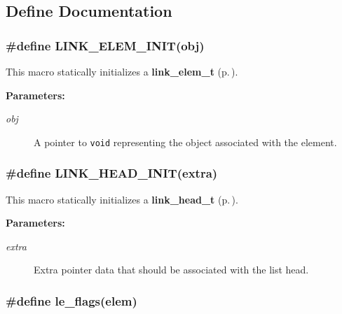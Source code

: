 \subsection{Define Documentation}
\subsubsection{\setlength{\rightskip}{0pt plus 5cm}\#define LINK\_\-ELEM\_\-INIT(obj)}\label{group__dbprim__link_a19}




 This macro statically initializes a {\bf link\_\-elem\_\-t} {\rm (p.\,\pageref{group__dbprim__link_a1})}.\begin{Desc}
\item[{\bf Parameters: }]\par
\begin{description}
\item[
{\em obj}]A pointer to {\tt void} representing the object associated with the element. \end{description}
\end{Desc}
\subsubsection{\setlength{\rightskip}{0pt plus 5cm}\#define LINK\_\-HEAD\_\-INIT(extra)}\label{group__dbprim__link_a13}




 This macro statically initializes a {\bf link\_\-head\_\-t} {\rm (p.\,\pageref{group__dbprim__link_a0})}.\begin{Desc}
\item[{\bf Parameters: }]\par
\begin{description}
\item[
{\em extra}]Extra pointer data that should be associated with the list head. \end{description}
\end{Desc}
\subsubsection{\setlength{\rightskip}{0pt plus 5cm}\#define le\_\-flags(elem)}\label{group__dbprim__link_a25}




